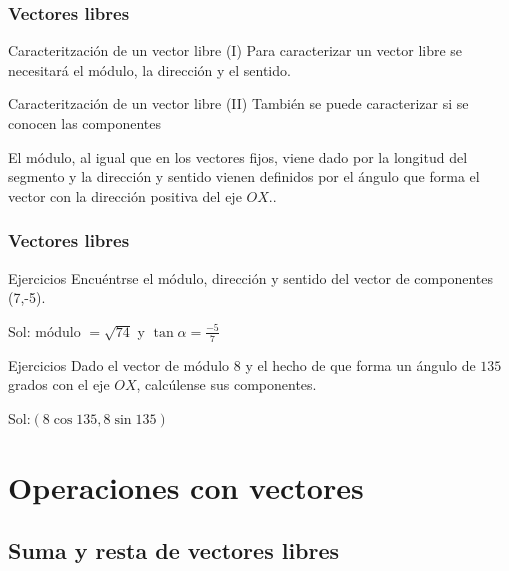 \documentclass{beamer}
\begin{document}
\begin{frame}
  \frametitle{Vectores libres}
  
  \begin{block}{Caracteritzaci\'on de un vector libre (I)}
Para caracterizar un vector libre se necesitar\'a el m\'odulo, la direcci\'on y el sentido.
 \end{block}
   \begin{block}{Caracteritzaci\'on de un vector libre (II)}
Tambi\'en se puede caracterizar si se conocen las componentes
\end{block}
El m\'odulo, al igual que en los vectores fijos, viene dado por la longitud del segmento y la direcci\'on y sentido vienen definidos por el \'angulo que forma el vector con la direcci\'on positiva del eje $OX$..

\end{frame}

\begin{frame}
  \frametitle{Vectores libres}
  
  \begin{block}{Ejercicios}
Encu\'entrse el m\'odulo, direcci\'on y sentido del vector de componentes (7,-5). 
\end{block}
Sol: m\'odulo $=\sqrt{74}$ y $\tan \alpha=\frac{-5}{7}$
   \begin{block}{Ejercicios}
  Dado el vector de m\'odulo $8$ y el hecho de que forma un \'angulo de $135$ grados con el eje $OX$, calc\'ulense sus componentes.
    \end{block}
Sol:$(8\cos 135, 8\sin 135)$
\end{frame}


\section{Operaciones con vectores}

\subsection{Suma y resta de vectores libres}
\end{document}
